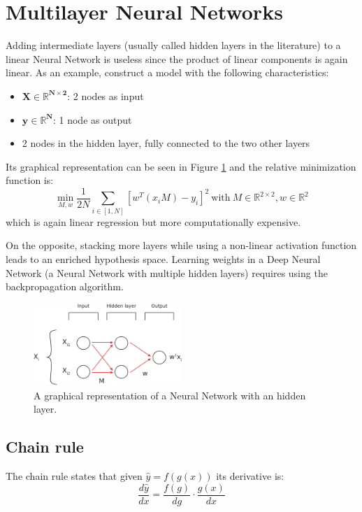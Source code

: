 \section{Multilayer Neural Networks}
Adding intermediate layers (usually called hidden layers in the literature)
to a linear Neural Network is useless
since the product of linear components is again linear.
As an example, construct a model with the following characteristics:
\begin{itemize}
    \item $\boldsymbol{X \in \mathbb{R}^{N \times 2}}$: 2 nodes as input
    \item $\boldsymbol{y \in \mathbb{R}^N}$: 1 node as output
    \item 2 nodes in the hidden layer, fully connected to the two other layers
\end{itemize}
Its graphical representation can be seen in Figure \ref{fig:nn-multi}
and the relative minimization function is:
\[ \displaystyle \min_{M, w} \frac{1}{2N} \sum_{i \in [1, N]} [ w^T (x_i M) - y_i ]^2
    \ \text{with} \
    M \in \mathbb{R}^{2 \times 2}, w \in \mathbb{R}^{2}\]
which is again linear regression but more computationally expensive.

On the opposite, stacking more layers while using a non-linear activation function
leads to an enriched hypothesis space. Learning weights in a Deep Neural Network
(a Neural Network with multiple hidden layers) requires using the backpropagation algorithm.

\begin{figure}[h]
    \centering
    \includegraphics[width=0.5\textwidth]{images/nn-multi.eps}
    \caption{A graphical representation of a Neural Network with an hidden layer.}
    \label{fig:nn-multi}
\end{figure}

\subsection{Chain rule}
The chain rule states that given $\hat{y} = f(g(x))$ its derivative is:
\[ \frac{d\hat{y}}{dx} = \frac{f(g)}{dg} \cdot \frac{g(x)}{dx} \]


